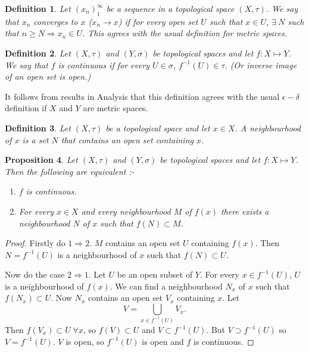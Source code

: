 \documentclass{notes}
\theoremstyle{plain}
\newtheorem{proposition}{Proposition}[chapter]
\newtheorem{definition}[proposition]{Definition}
\begin{document}
\begin{definition}
  Let $(x_n)_1^\infty$ be a sequence in a topological space
  $(X,\tau)$.  We say that $x_n$ converges to $x$ ($x_n \rightarrow
  x$) if for every open set $U$ such that $x \in U$, $\exists\ N$ such
  that $n \ge N \Rightarrow x_n \in U$.  This agrees with the usual
  definition for metric spaces.
\end{definition}

\begin{definition}
  Let $(X,\tau)$ and $(Y,\sigma)$ be topological spaces and let $f
  \colon X \mapsto Y$.  We say that $f$ is continuous if for every $U
  \in \sigma$, $f^{-1}(U) \in \tau$.  (Or inverse image of an open set
  is open.)
\end{definition}

It follows from results in Analysis that this definition agrees with
the usual $\epsilon - \delta$ definition if $X$ and $Y$ are metric
spaces.

\begin{definition}
Let $(X,\tau)$ be a topological space and let $x \in X$.  A neighbourhood%
 of $x$ is a set $N$ that contains an open set
containing $x$.
\end{definition}

\begin{proposition}
  Let $(X,\tau)$ and $(Y,\sigma)$ be topological spaces and let $f
  \colon X \mapsto Y$.  Then the following are equivalent :-
\begin{enumerate}
\item $f$ is continuous.
\item For every $x \in X$ and every neighbourhood $M$ of $f(x)$ there
  exists a neighbourhood $N$ of $x$ such that $f(N) \subset M$.
\end{enumerate}
\end{proposition}

\begin{proof}
  Firstly do $1 \Rightarrow 2$.  $M$ contains an open set $U$
  containing $f(x)$.  Then $N = f^{-1}(U)$ is a neighbourhood of $x$
  such that $f(N) \subset U$.
  
  Now do the case $2 \Rightarrow 1$.  Let $U$ be an open subset of
  $Y$. For every $x \in f^{-1}(U)$, $U$ is a neighbourhood of $f(x)$.
  We can find a neighbourhood $N_x$ of $x$ such that $f(N_x) \subset
  U$.  Now $N_x$ contains an open set $V_x$ containing $x$.  Let
\[
V = \bigcup_{x \in f^{-1}(U)} V_x.
\]
Then $f(V_x) \subset U \; \forall x$, so $f(V) \subset U$ and $V
\subset f^{-1}(U)$.  But $V \supset f^{-1}(U)$ so $V = f^{-1}(U)$.
$V$ is open, so $f^{-1}(U)$ is open and $f$ is continuous.
\end{proof}
\end{document}
